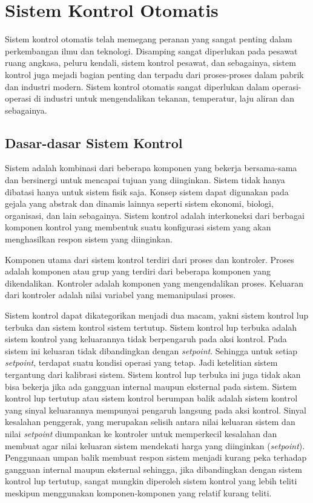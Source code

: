 \section{Sistem Kontrol Otomatis}

Sistem kontrol otomatis telah memegang peranan yang sangat penting dalam
perkembangan ilmu dan teknologi. Disamping sangat diperlukan pada pesawat ruang angkasa, peluru kendali, sistem kontrol pesawat, dan sebagainya, sistem kontrol juga mejadi bagian penting dan terpadu dari proses-proses dalam pabrik dan industri modern. Sistem kontrol otomatis sangat diperlukan dalam operasi-operasi di industri untuk mengendalikan tekanan, temperatur, laju aliran dan sebagainya.

\subsection{Dasar-dasar Sistem Kontrol}

Sistem adalah kombinasi dari beberapa komponen yang bekerja bersama-sama dan bersinergi untuk mencapai tujuan yang diinginkan. Sistem tidak hanya dibatasi hanya untuk sistem fisik saja. Konsep sistem dapat digunakan pada gejala yang abstrak dan dinamis lainnya seperti sistem ekonomi, biologi, organisasi, dan lain sebagainya. Sistem kontrol adalah interkoneksi dari berbagai komponen kontrol yang membentuk suatu konfigurasi sistem yang akan menghasilkan respon sistem yang diinginkan.

Komponen utama dari sistem kontrol terdiri dari proses dan kontroler. Proses adalah komponen atau grup yang terdiri dari beberapa komponen yang dikendalikan. Kontroler adalah komponen yang mengendalikan proses. Keluaran dari kontroler adalah nilai variabel yang memanipulasi proses.

Sistem kontrol dapat dikategorikan menjadi dua macam, yakni sistem kontrol lup terbuka dan sistem kontrol sistem tertutup. Sistem kontrol lup terbuka adalah sistem kontrol yang keluarannya tidak berpengaruh pada aksi kontrol. Pada sistem ini keluaran tidak dibandingkan dengan \textit{setpoint}. Sehingga untuk setiap \textit{setpoint}, terdapat suatu kondisi operasi yang tetap. Jadi ketelitian sistem tergantung dari kalibrasi sistem. Sistem kontrol lup terbuka ini juga tidak akan bisa bekerja jika ada gangguan internal maupun eksternal pada sistem. Sistem kontrol lup tertutup atau sistem kontrol berumpan balik adalah sistem kontrol yang sinyal keluarannya mempunyai pengaruh langsung pada aksi kontrol. Sinyal kesalahan penggerak, yang merupakan selisih antara nilai keluaran sistem dan nilai \textit{setpoint} diumpankan ke kontroler untuk memperkecil kesalahan dan membuat agar nilai keluaran sistem mendekati harga yang diinginkan (\textit{setpoint}). Penggunaan umpan balik membuat respon sistem menjadi kurang peka terhadap gangguan internal maupun eksternal sehingga, jika dibandingkan dengan sistem kontrol lup tertutup, sangat mungkin diperoleh sistem kontrol yang lebih teliti meskipun menggunakan komponen-komponen yang relatif kurang teliti.

